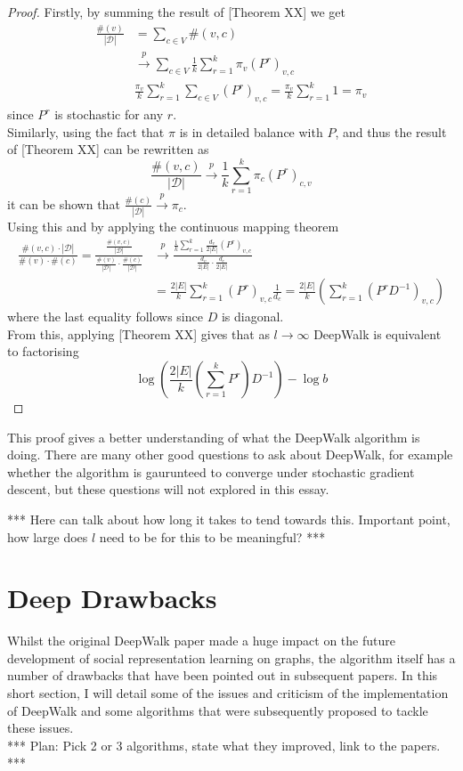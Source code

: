 \documentclass[a4paper]{article}
\newcommand{\D}{\mathcal D}
\begin{document}
\MainDeepWalk*
\begin{proof}
  Firstly, by summing the result of [Theorem XX] we get
  \begin{align*}
    \frac{\#(v)}{|\D|} &= \sum_{c \in V}\#(v, c)\\
                       &\overset{p}{\to} \sum_{c \in V} \frac{1}{k}\sum_{r=1}^k \pi_v(P^r)_{v, c}\\
                       &\frac{\pi_v}{k}\sum_{r = 1}^k \sum_{c \in V}(P^r)_{v,c} = \frac{\pi_v}{k}\sum_{r = 1}^k 1 = \pi_v
  \end{align*}
  since $P^r$ is stochastic for any $r$.\\
  Similarly, using the fact that $\pi$ is in detailed balance with $P$, and thus
  the result of [Theorem XX] can be rewritten as
  \[\frac{\#(v, c)}{|\D|} \overset{p}{\to} \frac{1}{k} \sum_{r = 1}^k \pi_c
    (P^r)_{c,v}\]
  it can be shown that $\frac{\#(c)}{|\D|} \overset{p}{\to} \pi_c$.\\
  Using this and by applying the continuous mapping theorem
  \begin{align*}
    \frac{\#(v, c) \cdot |\D|}{\#(v) \cdot \#(c)} = \frac{\frac{\#(v,c)}{|\D|}}{\frac{\#(v)}{|\D|} \cdot \frac{\#(c)}{|\D|}} & \overset{p}{\to} \frac{\frac{1}{k}\sum_{r=1}^{k} \frac{d_v}{2|E|}(P^r)_{v, c}}{\frac{d_v}{2|E|} \cdot \frac{d_c}{2|E|}}\\
                                                                                                                             &=\frac{2|E|}{k}\sum_{r=1}^k (P^r)_{v,c} \frac{1}{d_c} = \frac{2|E|}{k}\left( \sum_{r=1}^k(P^rD^{-1})_{v,c} \right)
  \end{align*}
  where the last equality follows since $D$ is diagonal.\\
  From this, applying [Theorem XX] gives that as $l \to \infty$ DeepWalk is equivalent to
  factorising
  \[\log \left( \frac{2|E|}{k}\left( \sum_{r=1}^k P^r \right)D^{-1}\right) - \log{b}\]
\end{proof}
This proof gives a better understanding of what the DeepWalk algorithm is doing.
There are many other good questions to ask about DeepWalk, for example whether
the algorithm is gaurunteed to converge under stochastic gradient descent, but
these questions will not explored in this essay.

*** Here can talk about how long it takes to tend towards this. Important point, how
large does $l$ need to be for this to be meaningful? ***
\section{Deep Drawbacks}
Whilst the original DeepWalk paper made a huge impact on the future development
of social representation learning on graphs, the algorithm itself has a number
of drawbacks that have been pointed out in subsequent papers. In this short
section, I will detail some of the issues and criticism of the implementation of
DeepWalk and some algorithms that were subsequently proposed to tackle these issues.\\
***
Plan: Pick 2 or 3 algorithms, state what they improved, link to the papers.
***
\end{document}
